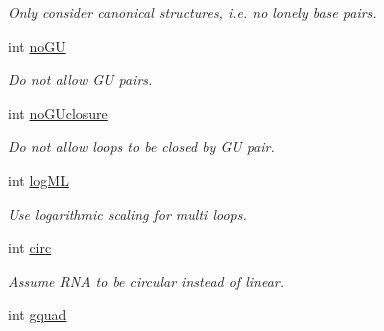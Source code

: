 \begin{DoxyCompactItemize}
\begin{DoxyCompactList}\small\item\em Only consider canonical structures, i.\+e. no \textquotesingle{}lonely\textquotesingle{} base pairs. \end{DoxyCompactList}\item 
\hypertarget{group__model__details_ad64a5eaf9c4550e7525b36a725fec4b2}{}int \hyperlink{group__model__details_ad64a5eaf9c4550e7525b36a725fec4b2}{no\+G\+U}\label{group__model__details_ad64a5eaf9c4550e7525b36a725fec4b2}

\begin{DoxyCompactList}\small\item\em Do not allow G\+U pairs. \end{DoxyCompactList}\item 
\hypertarget{group__model__details_a7e883db1f33f8f3baa5c9b140350c78e}{}int \hyperlink{group__model__details_a7e883db1f33f8f3baa5c9b140350c78e}{no\+G\+Uclosure}\label{group__model__details_a7e883db1f33f8f3baa5c9b140350c78e}

\begin{DoxyCompactList}\small\item\em Do not allow loops to be closed by G\+U pair. \end{DoxyCompactList}\item 
\hypertarget{group__model__details_ae259f89a94acae0c7f1412603e7f57b5}{}int \hyperlink{group__model__details_ae259f89a94acae0c7f1412603e7f57b5}{log\+M\+L}\label{group__model__details_ae259f89a94acae0c7f1412603e7f57b5}

\begin{DoxyCompactList}\small\item\em Use logarithmic scaling for multi loops. \end{DoxyCompactList}\item 
\hypertarget{group__model__details_a92762e1008503d4623ff5c01e358a464}{}int \hyperlink{group__model__details_a92762e1008503d4623ff5c01e358a464}{circ}\label{group__model__details_a92762e1008503d4623ff5c01e358a464}

\begin{DoxyCompactList}\small\item\em Assume R\+N\+A to be circular instead of linear. \end{DoxyCompactList}\item 
\hypertarget{group__model__details_af88a511a2b1f526b4c6213de6cb8fd6e}{}int \hyperlink{group__model__details_af88a511a2b1f526b4c6213de6cb8fd6e}{gquad}\label{group__model__details_af88a511a2b1f526b4c6213de6cb8fd6e}


\end{DoxyCompactItemize}
